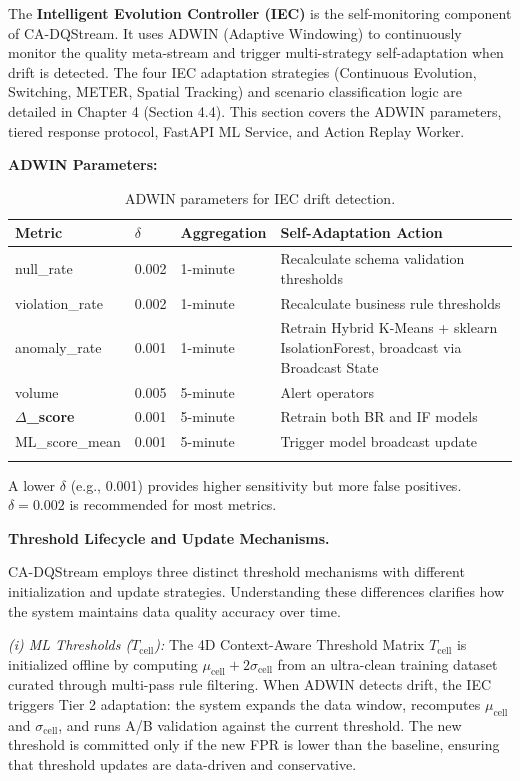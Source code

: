 The \textbf{Intelligent Evolution Controller (IEC)} is the self-monitoring component of CA-DQStream. It uses ADWIN (Adaptive Windowing) to continuously monitor the quality meta-stream and trigger multi-strategy self-adaptation when drift is detected. The four IEC adaptation strategies (Continuous Evolution, Switching, METER, Spatial Tracking) and scenario classification logic are detailed in Chapter 4 (Section 4.4). This section covers the ADWIN parameters, tiered response protocol, FastAPI ML Service, and Action Replay Worker.

\textbf{ADWIN Parameters:}

\begin{longtable}{|m{2.5cm}|M{2cm}|m{2.5cm}|m{5.5cm}|}
\hline
\textbf{Metric} & \textbf{$\delta$} & \textbf{Aggregation} & \textbf{Self-Adaptation Action} \\ \hline
null\_rate & 0.002 & 1-minute & Recalculate schema validation thresholds \\ \hline
violation\_rate & 0.002 & 1-minute & Recalculate business rule thresholds \\ \hline
anomaly\_rate & 0.001 & 1-minute & Retrain Hybrid K-Means + sklearn IsolationForest, broadcast via Broadcast State \\ \hline
volume & 0.005 & 5-minute & Alert operators \\ \hline
\textbf{$\Delta$\_score} & 0.001 & 5-minute & Retrain both BR and IF models \\ \hline
ML\_score\_mean & 0.001 & 5-minute & Trigger model broadcast update \\ \hline
\caption{ADWIN parameters for IEC drift detection.}
\label{tab:adwin_params}
\end{longtable}

A lower $\delta$ (e.g., 0.001) provides higher sensitivity but more false positives. $\delta=0.002$ is recommended for most metrics.

\bigskip
\noindent\textbf{Threshold Lifecycle and Update Mechanisms.}

CA-DQStream employs three distinct threshold mechanisms with different initialization and update strategies. Understanding these differences clarifies how the system maintains data quality accuracy over time.

\textit{(i) ML Thresholds ($T_{\text{cell}}$):} The 4D Context-Aware Threshold Matrix $T_{\text{cell}}$ is initialized offline by computing $\mu_{\text{cell}} + 2\sigma_{\text{cell}}$ from an ultra-clean training dataset curated through multi-pass rule filtering. When ADWIN detects drift, the IEC triggers Tier 2 adaptation: the system expands the data window, recomputes $\mu_{\text{cell}}$ and $\sigma_{\text{cell}}$, and runs A/B validation against the current threshold. The new threshold is committed only if the new FPR is lower than the baseline, ensuring that threshold updates are data-driven and conservative.


